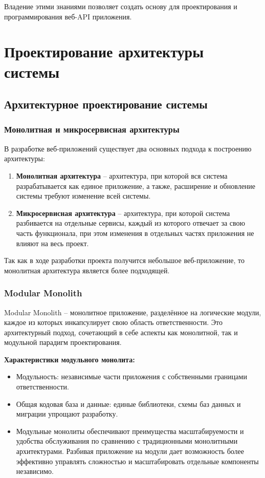 \documentclass[a4paper,12pt]{report}
\begin{document}
Владение этими знаниями позволяет создать основу для проектирования и программирования веб-\acs{API} приложения.

\chapter{Проектирование архитектуры системы}\label{architecture_chapter_title}

\section{Архитектурное проектирование системы}

\subsection{Монолитная и микросервисная архитектуры}

В разработке веб-приложений существует два основных подхода к построению архитектуры:
\begin{enumerate}
    \item
        \textbf{Монолитная архитектура} -- архитектура, при которой вся система разрабатывается как единое приложение, 
        а также, расширение и обновление системы требуют изменение всей системы.
    \item
        \textbf{Микросервисная архитектура} -- архитектура, при которой система разбивается на отдельные сервисы, 
        каждый из которого отвечает за свою часть функционала, при этом изменения в отдельных частях приложения не влияют на весь проект.\cite{application_architecture}
\end{enumerate}

Так как в ходе разработки проекта получится небольшое веб-приложение, то монолитная архитектура является более подходящей.

\subsection{Modular Monolith}

Modular Monolith -- монолитное приложение, разделённое на логические модули, каждое из которых инкапсулирует свою область ответственности.
Это архитектурный подход, сочетающий в себе аспекты как монолитной, так и модульной парадигм проектирования.\cite{modular_monolith}

\textbf{Характеристики модульного монолита:}
\begin{itemize}
    \item
        Модульность: независимые части приложения с собственными границами ответственности.
    \item 
        Общая кодовая база и данные: единые библиотеки, схемы баз данных и миграции упрощают разработку.
    \item
        Модульные монолиты обеспечивают преимущества масштабируемости и удобства обслуживания по сравнению 
        с традиционными монолитными архитектурами. Разбивая приложение на модули дает возможность более 
        эффективно управлять сложностью и масштабировать отдельные компоненты независимо.
\end{itemize}
\end{document}
